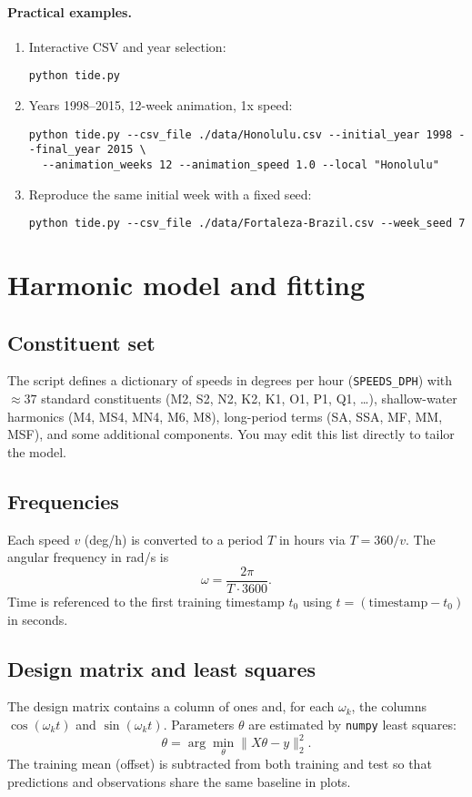 \documentclass[11pt,a4paper]{article}
\begin{document}
\paragraph{Practical examples.}
\begin{enumerate}[leftmargin=1.5em]
  \item Interactive CSV and year selection:
\begin{lstlisting}[style=py]
python tide.py
\end{lstlisting}
  \item Years 1998--2015, 12-week animation, 1x speed:
\begin{lstlisting}[style=py]
python tide.py --csv_file ./data/Honolulu.csv --initial_year 1998 --final_year 2015 \
  --animation_weeks 12 --animation_speed 1.0 --local "Honolulu"
\end{lstlisting}
  \item Reproduce the same initial week with a fixed seed:
\begin{lstlisting}[style=py]
python tide.py --csv_file ./data/Fortaleza-Brazil.csv --week_seed 7
\end{lstlisting}
\end{enumerate}

\section{Harmonic model and fitting}
\subsection{Constituent set}
The script defines a dictionary of speeds in degrees per hour (\texttt{SPEEDS\_DPH}) with $\approx 37$ standard constituents (M2, S2, N2, K2, K1, O1, P1, Q1, \dots), shallow-water harmonics (M4, MS4, MN4, M6, M8), long-period terms (SA, SSA, MF, MM, MSF), and some additional components. You may edit this list directly to tailor the model.

\subsection{Frequencies}
Each speed $v$ (deg/h) is converted to a period $T$ in hours via $T=360/v$. The angular frequency in rad/s is
\[
\omega=\frac{2\pi}{T\cdot 3600}.
\]
Time is referenced to the first training timestamp $t_0$ using $t=(\text{timestamp}-t_0)$ in seconds.

\subsection{Design matrix and least squares}
The design matrix contains a column of ones and, for each $\omega_k$, the columns $\cos(\omega_k t)$ and $\sin(\omega_k t)$. Parameters $\theta$ are estimated by \texttt{numpy} least squares:
\[
\theta=\arg\min_\theta \|X\theta - y\|_2^2.
\]
The training mean (offset) is subtracted from both training and test so that predictions and observations share the same baseline in plots.
\end{document}
